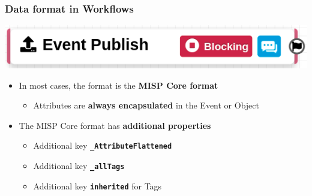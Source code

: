 \begin{frame}
    \frametitle{Data format in Workflows}
    \begin{center}
        \includegraphics[width=0.7\linewidth]{pictures/workflow-trigger.png}
    \end{center}
    \begin{itemize}
        \item In most cases, the format is the \textbf{MISP Core format}
        \begin{itemize}
            \item Attributes are \textbf{always encapsulated} in the Event or Object
        \end{itemize}
        \item The MISP Core format has \textbf{additional properties}
        \begin{itemize}
            \item Additional key \textbf{\texttt{\_AttributeFlattened}}
            \item Additional key \textbf{\texttt{\_allTags}}
            \item Additional key \textbf{\texttt{inherited}} for Tags
        \end{itemize}
    \end{itemize}
\end{frame}

